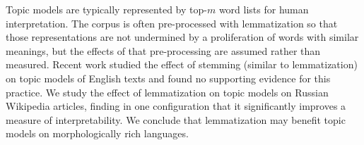 Topic models are typically represented by top-$m$ word lists for human
interpretation.  The corpus is often pre-processed with lemmatization
so that those representations are not undermined by a proliferation of
words with similar meanings, but the effects of that pre-processing are
assumed rather than measured.  Recent work studied the effect of
stemming (similar to lemmatization) on topic models of English texts
and found no supporting evidence for this practice.  We study the
effect of lemmatization on topic models on Russian Wikipedia articles,
finding in one configuration that it significantly improves a measure
of interpretability.  We conclude that lemmatization may benefit
topic models on morphologically rich languages.
